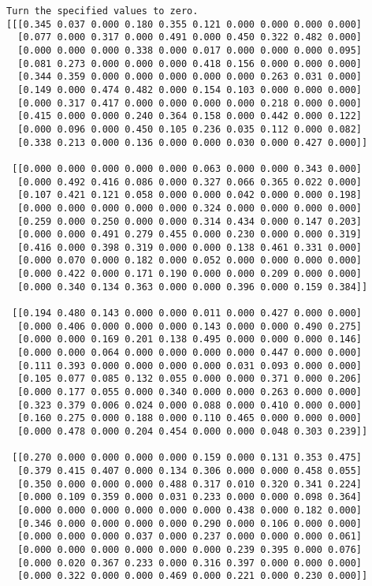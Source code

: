 \documentclass[11pt]{article}
\begin{document}
    \begin{Verbatim}[commandchars=\\\{\}]
Turn the specified values to zero.
[[[0.345 0.037 0.000 0.180 0.355 0.121 0.000 0.000 0.000 0.000]
  [0.077 0.000 0.317 0.000 0.491 0.000 0.450 0.322 0.482 0.000]
  [0.000 0.000 0.000 0.338 0.000 0.017 0.000 0.000 0.000 0.095]
  [0.081 0.273 0.000 0.000 0.000 0.418 0.156 0.000 0.000 0.000]
  [0.344 0.359 0.000 0.000 0.000 0.000 0.000 0.263 0.031 0.000]
  [0.149 0.000 0.474 0.482 0.000 0.154 0.103 0.000 0.000 0.000]
  [0.000 0.317 0.417 0.000 0.000 0.000 0.000 0.218 0.000 0.000]
  [0.415 0.000 0.000 0.240 0.364 0.158 0.000 0.442 0.000 0.122]
  [0.000 0.096 0.000 0.450 0.105 0.236 0.035 0.112 0.000 0.082]
  [0.338 0.213 0.000 0.136 0.000 0.000 0.030 0.000 0.427 0.000]]

 [[0.000 0.000 0.000 0.000 0.000 0.063 0.000 0.000 0.343 0.000]
  [0.000 0.492 0.416 0.086 0.000 0.327 0.066 0.365 0.022 0.000]
  [0.107 0.421 0.121 0.058 0.000 0.000 0.042 0.000 0.000 0.198]
  [0.000 0.000 0.000 0.000 0.000 0.324 0.000 0.000 0.000 0.000]
  [0.259 0.000 0.250 0.000 0.000 0.314 0.434 0.000 0.147 0.203]
  [0.000 0.000 0.491 0.279 0.455 0.000 0.230 0.000 0.000 0.319]
  [0.416 0.000 0.398 0.319 0.000 0.000 0.138 0.461 0.331 0.000]
  [0.000 0.070 0.000 0.182 0.000 0.052 0.000 0.000 0.000 0.000]
  [0.000 0.422 0.000 0.171 0.190 0.000 0.000 0.209 0.000 0.000]
  [0.000 0.340 0.134 0.363 0.000 0.000 0.396 0.000 0.159 0.384]]

 [[0.194 0.480 0.143 0.000 0.000 0.011 0.000 0.427 0.000 0.000]
  [0.000 0.406 0.000 0.000 0.000 0.143 0.000 0.000 0.490 0.275]
  [0.000 0.000 0.169 0.201 0.138 0.495 0.000 0.000 0.000 0.146]
  [0.000 0.000 0.064 0.000 0.000 0.000 0.000 0.447 0.000 0.000]
  [0.111 0.393 0.000 0.000 0.000 0.000 0.031 0.093 0.000 0.000]
  [0.105 0.077 0.085 0.132 0.055 0.000 0.000 0.371 0.000 0.206]
  [0.000 0.177 0.055 0.000 0.340 0.000 0.000 0.263 0.000 0.000]
  [0.323 0.379 0.006 0.024 0.000 0.088 0.000 0.410 0.000 0.000]
  [0.160 0.275 0.000 0.188 0.000 0.110 0.465 0.000 0.000 0.000]
  [0.000 0.478 0.000 0.204 0.454 0.000 0.000 0.048 0.303 0.239]]

 [[0.270 0.000 0.000 0.000 0.000 0.159 0.000 0.131 0.353 0.475]
  [0.379 0.415 0.407 0.000 0.134 0.306 0.000 0.000 0.458 0.055]
  [0.350 0.000 0.000 0.000 0.488 0.317 0.010 0.320 0.341 0.224]
  [0.000 0.109 0.359 0.000 0.031 0.233 0.000 0.000 0.098 0.364]
  [0.000 0.000 0.000 0.000 0.000 0.000 0.438 0.000 0.182 0.000]
  [0.346 0.000 0.000 0.000 0.000 0.290 0.000 0.106 0.000 0.000]
  [0.000 0.000 0.000 0.037 0.000 0.237 0.000 0.000 0.000 0.061]
  [0.000 0.000 0.000 0.000 0.000 0.000 0.239 0.395 0.000 0.076]
  [0.000 0.020 0.367 0.233 0.000 0.316 0.397 0.000 0.000 0.000]
  [0.000 0.322 0.000 0.000 0.469 0.000 0.221 0.000 0.230 0.000]]


\end{Verbatim}
\end{document}
